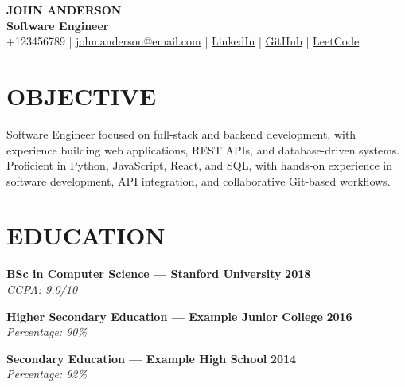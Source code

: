 \documentclass[10pt,a4paper]{article}
\newcommand{\resumeEntry}[3]{
    \textbf{#1} \hfill \textbf{#2}\\
    \textit{#3}
}
\begin{document}

\begin{center}

    {\Large\textbf{JOHN ANDERSON}}\\[2pt]

    \textbf{Software Engineer}\\[2pt]

    +123456789
    \;|\;
    \href{mailto:john.anderson@email.com}{john.anderson@email.com}
    \;|\;
    \href{https://www.linkedin.com/in/john-anderson}{LinkedIn}
    \;|\;
    \href{https://github.com/john}{GitHub}
    \;|\;
    \href{https://leetcode.com/john}{LeetCode}

\end{center}



\section*{OBJECTIVE}

Software Engineer focused on full-stack and backend development, with
experience building web applications, REST APIs, and database-driven systems.
Proficient in Python, JavaScript, React, and SQL, with hands-on experience in
software development, API integration, and collaborative Git-based workflows.



\section*{EDUCATION}

\resumeEntry
    {BSc in Computer Science --- Stanford University}
    {2018}
    {CGPA: 9.0/10}

\resumeEntry
    {Higher Secondary Education --- Example Junior College}
    {2016}
    {Percentage: 90\%}

\resumeEntry
    {Secondary Education --- Example High School}
    {2014}
    {Percentage: 92\%}


\end{document}

